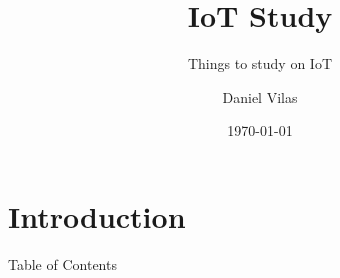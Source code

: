 \documentclass[]{beamer}
\title{IoT Study}
\subtitle{Things to study on IoT}
\date{\today}
\author{Daniel Vilas}
\begin{document}
\begin{frame}[plain]
	\maketitle
\end{frame}
\section{Introduction}
\begin{frame}{Table of Contents}
	\tableofcontents[]
\end{frame}


\end{document}
